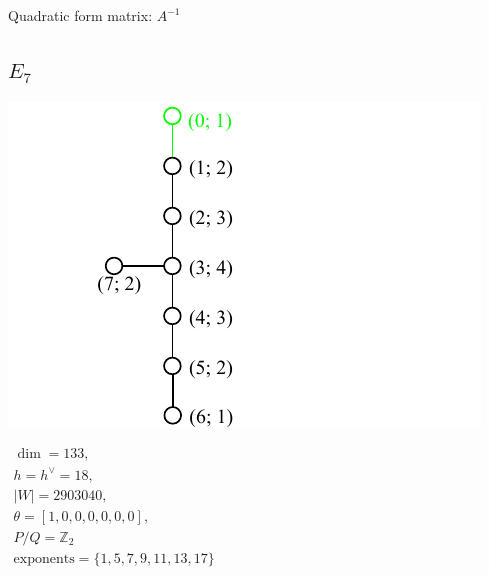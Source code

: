 \documentclass[12pt]{article}
\newcommand{\Zb}{\mathbb{Z}}
\newcommand{\hc}{h^{\vee}}
\begin{document}
Quadratic form matrix: $A^{-1}$

%
%
\newpage
%
\subsection*{$E_7$}
\parbox{8cm}{\includegraphics{lie_E7.pdf}}
$
\begin{array}{l}
 \dim = 133, \\
  h=\hc= 18,\\
 |W|= 2903040,\\
 \theta=[1,0,0,0,0,0,0],\\
 P/Q=\Zb_2 \\
 \text{exponents}={\{1,5,7,9,11,13,17\}}
\end{array}
$
\end{document}

